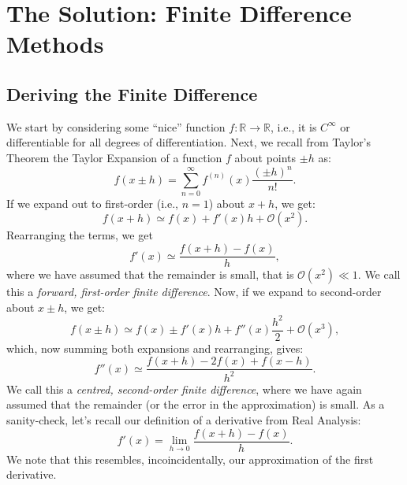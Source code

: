 \documentclass[11pt]{article}
\begin{document}
\section*{The Solution: Finite Difference Methods}

\subsection*{Deriving the Finite Difference}
We start by considering some ``nice'' function $f: \mathbb{R} \to \mathbb{R}$, i.e., it is $C^\infty$ or differentiable for all degrees of differentiation.
Next, we recall from Taylor's Theorem the Taylor Expansion of a function $f$ about points $\pm h$ as:
\begin{equation}
	f\left(x\pm h\right) = \sum_{n=0}^\infty f^{\left(n\right)}\left(x\right)\frac{\left(\pm h\right)^n}{n!}.
	\label{eq:taylor}
\end{equation}
If we expand out to first-order (i.e., $n=1$) about $x+h$, we get:
\begin{equation}
	f\left(x + h\right) \simeq f\left(x\right) + f'\left(x\right)h + \mathcal{O}\left(x^2\right).
\end{equation}
Rearranging the terms, we get
\begin{equation}
	f'\left(x\right) \simeq \frac{f\left(x+h\right) - f\left(x\right)}{h},
	\label{eq:first}
\end{equation}
where we have assumed that the remainder is small, that is $\mathcal{O}\left(x^2\right) \ll 1$.
We call this a \emph{forward, first-order finite difference}.
Now, if we expand to second-order about $x \pm h$, we get:
\begin{equation}
	f\left(x\pm h\right) \simeq f\left(x\right) \pm f'\left(x\right)h + f''\left(x\right) \frac{h^2}{2} + \mathcal{O}\left(x^3\right),
\end{equation}
which, now summing both expansions and rearranging, gives:
\begin{equation}
	f''\left(x\right) \simeq \frac{f\left(x + h \right) - 2f\left(x\right) + f\left(x - h\right)}{h^2}.
	\label{eq:second}
\end{equation}
We call this a \emph {centred, second-order finite difference}, where we have again assumed that the remainder (or the error in the approximation) is small. 
As a sanity-check, let's recall our definition of a derivative from Real Analysis:
\begin{equation}
	f'\left(x\right) = \lim_{h\to 0} \frac{f\left(x+h\right) - f\left(x\right)}{h}.
\end{equation}
We note that this resembles, incoincidentally, our approximation of the first derivative.
\end{document}
